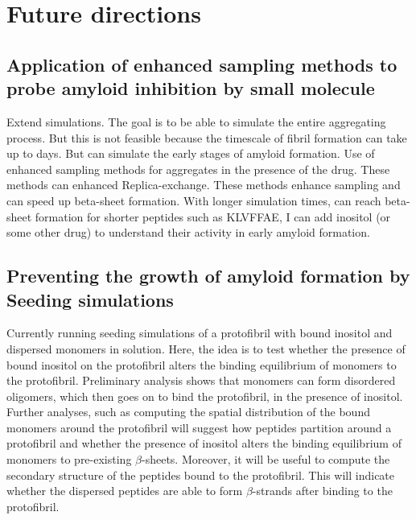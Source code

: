 
\section{Future directions}

\subsection{Application of enhanced sampling methods to probe amyloid inhibition by small molecule}
Extend simulations. The goal is to be able to simulate the entire aggregating process.  But this is not feasible because the timescale of fibril formation can take up to days. But can simulate the early stages of amyloid formation.  Use of enhanced sampling methods for aggregates in the presence of the drug.  These methods can enhanced Replica-exchange.  These methods enhance sampling and can speed up beta-sheet formation. With longer simulation times, can reach beta-sheet formation for shorter peptides such as KLVFFAE, I can add inositol (or some other drug) to understand their activity in early amyloid formation.

\subsection{Preventing the growth of amyloid formation by Seeding simulations}
Currently running seeding simulations of a protofibril with bound inositol and dispersed monomers in solution. Here, the idea is to test whether the presence of bound inositol on the protofibril alters the binding equilibrium of monomers to the protofibril. Preliminary analysis shows that monomers can form disordered oligomers, which then goes on to bind the protofibril, in the presence of inositol.  Further analyses, such as computing the spatial distribution of the bound monomers around the protofibril will suggest how peptides partition around a protofibril and whether the presence of inositol alters the binding equilibrium of monomers to pre-existing $\beta$-sheets. Moreover, it will be useful to compute the secondary structure of the peptides bound to the protofibril.  This will indicate whether the dispersed peptides are able to form $\beta$-strands after binding to the protofibril.

